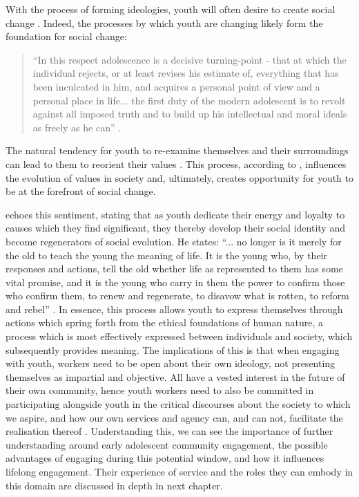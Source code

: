 With the process of forming ideologies, youth will often desire to create social change \citep{Juhasz1982}. Indeed, the processes by which youth are changing likely form the foundation for social change: 
\begin{quote}
“In this respect adolescence is a decisive turning-point - that at which the individual rejects, or at least revises his estimate of, everything that has been inculcated in him, and acquires a personal point of view and a personal place in life... the first duty of the modern adolescent is to revolt against all imposed truth and to build up his intellectual and moral ideals as freely as he can” \citep[][pp3-4]{Piaget1947}. 
\end{quote}
The natural tendency for youth to re-examine themselves and their surroundings can lead to them to reorient their values \citep[][]{Mead1947}. This process, according to \citet{Verlande2002}, influences the evolution of values in society and, ultimately, creates opportunity for youth to be at the forefront of social change. 

\citet{Erikson1968} echoes this sentiment, stating that as youth dedicate their energy and loyalty to causes which they find significant, they thereby develop their social identity and become regenerators of social evolution. He states: “... no longer is it merely for the old to teach the young the meaning of life. It is the young who, by their responses and actions, tell the old whether life as represented to them has some vital promise, and it is the young who carry in them the power to confirm those who confirm them, to renew and regenerate, to disavow what is rotten, to reform and rebel” \citep[][p258]{Erikson1968}. In essence, this process allows youth to express themselves through actions which spring forth from the ethical foundations of human nature, a process which is most effectively expressed between individuals and society, which subsequently provides meaning. The implications of this is that when engaging with youth, workers need to be open about their own ideology, not presenting themselves as impartial and objective. All have a vested interest in the future of their own community, hence youth workers need to also be committed in participating alongside youth in the critical discourses about the society to which we aspire, and how our own services and agency can, and can not, facilitate the realisation thereof \citep[][p52]{Shukra2012}. Understanding this, we can see the importance of further understanding around early adolescent community engagement, the possible advantages of engaging during this potential window, and how it influences lifelong engagement. Their experience of service and the roles they can embody in this domain are discussed in depth in next chapter. 
 

